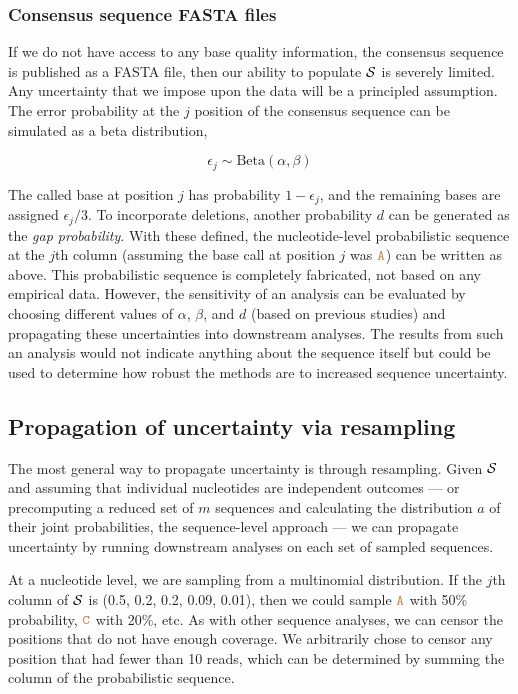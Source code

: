 \documentclass[10pt]{article}
\begin{document}
\subsubsection{Consensus sequence FASTA files}


If we do not have access to any base quality information, \eg the consensus sequence is published as a FASTA file, then our ability to populate $\mathcal{S}$ is severely limited.
Any uncertainty that we impose upon the data will be a principled assumption.
The error probability at the $j$ position of the consensus sequence can be simulated as a beta distribution, \ie \vspace{-4mm}

$$
\epsilon_j \sim\text{Beta}(\alpha, \beta)
$$

The called base at position $j$ has probability $1-\epsilon_j$, and the remaining bases are assigned $\epsilon_j/3$.
To incorporate deletions, another probability $d$ can be generated as the \emph{gap probability}.
With these defined, the nucleotide-level probabilistic sequence at the $j$th column (assuming the base call at position $j$ was $\texttt{\textcolor{brown}{A}}$) can be written as above.
This probabilistic sequence is completely fabricated, \ie not based on any empirical data.
However, the sensitivity of an analysis can be evaluated by choosing different values of $\alpha$, $\beta$, and $d$ (\eg based on previous studies) and propagating these uncertainties into downstream analyses.
The results from such an analysis would not indicate anything about the sequence itself but could be used to determine how robust the methods are to increased sequence uncertainty.


\subsection{Propagation of uncertainty via resampling}

The most general way to propagate uncertainty is through resampling.
Given $\mathcal{S}$ and assuming that individual nucleotides are independent outcomes --- or precomputing a reduced set of $m$ sequences and calculating the distribution $a$ of their joint probabilities, \ie the sequence-level approach --- we can propagate uncertainty by running downstream analyses on each set of sampled sequences.

At a nucleotide level, we are sampling from a multinomial distribution.
If the $j$th column of $\mathcal{S}$ is (0.5, 0.2, 0.2, 0.09, 0.01), then we could sample $\texttt{\textcolor{brown}{A}}$ with 50\% probability, $\texttt{\textcolor{brown}{C}}$ with 20\%, etc.
As with other sequence analyses, we can censor the positions that do not have enough coverage.
We arbitrarily chose to censor any position that had fewer than 10 reads, which can be determined by summing the column of the probabilistic sequence.
\end{document}
